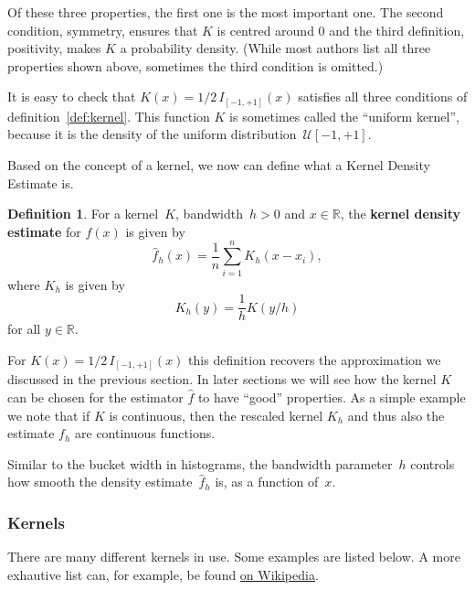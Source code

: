 \documentclass[
  a4paper,
]{article}
\theoremstyle{definition}
\newtheorem{definition}{Definition}[section]
\theoremstyle{definition}
\theoremstyle{definition}
\theoremstyle{definition}
\theoremstyle{remark}
\begin{document}
Of these three properties, the first one is the most important one.
The second condition, symmetry, ensures that \(K\) is centred around \(0\)
and the third definition, positivity, makes \(K\) a probability density.
(While most authors list all three properties shown above, sometimes
the third condition is omitted.)

It is easy to check that \(K(x) = 1/2 \, I_{[-1,+1]}(x)\) satisfies all
three conditions of definition~\ref{def:kernel}. This function \(K\)
is sometimes called the ``uniform kernel'', because it is the density
of the uniform distribution~\(\mathcal{U}[-1,+1]\).

Based on the concept of a kernel, we now can define
what a Kernel Density Estimate is.

\begin{definition}
\protect\hypertarget{def:KDE}{}\label{def:KDE}For a kernel~\(K\), bandwidth~\(h > 0\) and \(x \in \mathbb{R}\), the
\textbf{kernel density estimate} for \(f(x)\) is given by
\begin{equation*}
  \hat f_h(x)
  = \frac{1}{n} \sum_{i=1}^n K_h(x - x_i),
\end{equation*}
where \(K_h\) is given by
\begin{equation*}
  K_h(y)
  = \frac{1}{h} K(y/h)
\end{equation*}
for all \(y\in \mathbb{R}\).
\end{definition}

For \(K(x) = 1/2 \, I_{[-1,+1]}(x)\) this definition recovers the
approximation we discussed in the previous section. In later sections
we will see how the kernel \(K\) can be chosen for the estimator \(\hat f\) to have ``good'' properties. As a simple example we note that if \(K\)
is continuous, then the rescaled kernel \(K_h\) and thus also the
estimate \(f_h\) are continuous functions.

Similar to the bucket width in histograms, the bandwidth parameter~\(h\)
controls how smooth the density estimate~\(\hat f_h\) is, as a function
of~\(x\).

\hypertarget{kernels}{%
\subsubsection{Kernels}\label{kernels}}

There are many different kernels in use. Some examples are listed
below. A more exhautive list can, for example, be found
\href{https://en.wikipedia.org/wiki/Kernel_(statistics)\#Kernel_functions_in_common_use}{on Wikipedia}.
\end{document}

